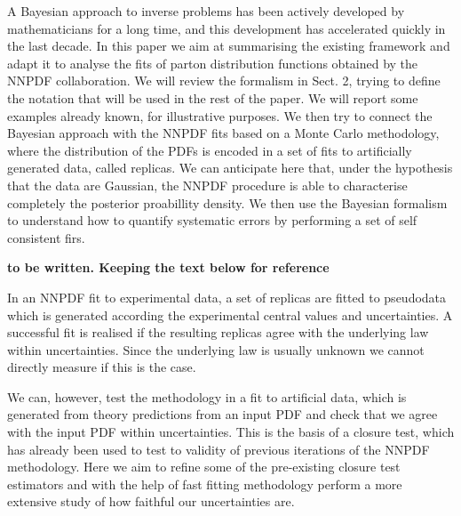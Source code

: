 A Bayesian approach to inverse problems has been actively developed by
mathematicians for a long time, and this development has accelerated quickly in
the last decade. In this paper we aim at summarising the existing framework and
adapt it to analyse the fits of parton distribution functions obtained by the
NNPDF collaboration. We will review the formalism in Sect. 2, trying to define
the notation that will be used in the rest of the paper. We will report some
examples already known, for illustrative purposes. We then try to connect the
Bayesian approach with the NNPDF fits based on a Monte Carlo methodology, where
the distribution of the PDFs is encoded in a set of fits to artificially
generated data, called replicas. We can anticipate here that, under the
hypothesis that the data are Gaussian, the NNPDF procedure is able to
characterise completely the posterior proabillity density. We then use the
Bayesian formalism to understand how to quantify systematic errors by performing
a set of self consistent firs. 

{\bf to be written. Keeping the text below for reference}

In an NNPDF fit to experimental data, a set of replicas are fitted to pseudodata
which is generated according the experimental central values and uncertainties.
A successful fit is realised if the resulting replicas agree with the underlying
law within uncertainties. Since the underlying law is usually unknown we cannot
directly measure if this is the case.

We can, however, test the methodology in a fit to artificial data, which is
generated from theory predictions from an input PDF and check that we agree with
the input PDF within uncertainties. This is the basis of a closure test, which
has already been used to test to validity of previous iterations of the NNPDF
methodology. Here we aim to refine some of the pre-existing closure test
estimators and with the help of fast fitting methodology perform a more
extensive study of how faithful our uncertainties are.
